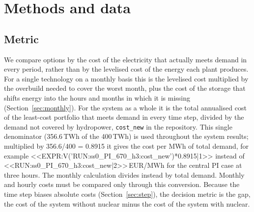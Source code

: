 \section{Methods and data}\label{sec:methods}

\subsection{Metric}
We compare options by the cost of the electricity that actually meets demand in every period, rather than by the levelised cost of the energy each plant produces. For a single technology on a monthly basis this is the levelised cost multiplied by the overbuild needed to cover the worst month, plus the cost of the storage that shifts energy into the hours and months in which it is missing (Section~\ref{sec:monthly}). For the system as a whole it is the total annualised cost of the least-cost portfolio that meets demand in every time step, divided by the demand not covered by hydropower, \texttt{cost\_new} in the repository. This single denominator (356.6\,TWh of the 400\,TWh) is used throughout the system results; multiplied by 356.6/400 = 0.8915 it gives the cost per MWh of total demand, for example <<EXPR:V('RUN:ss0_PI_670_h3:cost_new')*0.8915|1>> instead of <<RUN:ss0_PI_670_h3:cost_new|2>>\,EUR/MWh for the central PI case at three hours. The monthly calculation divides instead by total demand. Monthly and hourly costs must be compared only through this conversion. Because the time step biases absolute costs (Section~\ref{sec:step}), the decision metric is the gap, the cost of the system without nuclear minus the cost of the system with nuclear.


